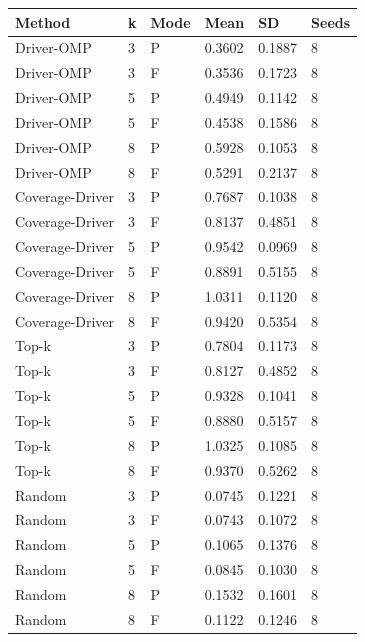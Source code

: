 \begin{tabular}{llllll}
\toprule
Method & k & Mode & Mean & SD & Seeds \\
\midrule
Driver-OMP & 3 & P & 0.3602 & 0.1887 & 8 \\
Driver-OMP & 3 & F & 0.3536 & 0.1723 & 8 \\
Driver-OMP & 5 & P & 0.4949 & 0.1142 & 8 \\
Driver-OMP & 5 & F & 0.4538 & 0.1586 & 8 \\
Driver-OMP & 8 & P & 0.5928 & 0.1053 & 8 \\
Driver-OMP & 8 & F & 0.5291 & 0.2137 & 8 \\
Coverage-Driver & 3 & P & 0.7687 & 0.1038 & 8 \\
Coverage-Driver & 3 & F & 0.8137 & 0.4851 & 8 \\
Coverage-Driver & 5 & P & 0.9542 & 0.0969 & 8 \\
Coverage-Driver & 5 & F & 0.8891 & 0.5155 & 8 \\
Coverage-Driver & 8 & P & 1.0311 & 0.1120 & 8 \\
Coverage-Driver & 8 & F & 0.9420 & 0.5354 & 8 \\
Top-k & 3 & P & 0.7804 & 0.1173 & 8 \\
Top-k & 3 & F & 0.8127 & 0.4852 & 8 \\
Top-k & 5 & P & 0.9328 & 0.1041 & 8 \\
Top-k & 5 & F & 0.8880 & 0.5157 & 8 \\
Top-k & 8 & P & 1.0325 & 0.1085 & 8 \\
Top-k & 8 & F & 0.9370 & 0.5262 & 8 \\
Random & 3 & P & 0.0745 & 0.1221 & 8 \\
Random & 3 & F & 0.0743 & 0.1072 & 8 \\
Random & 5 & P & 0.1065 & 0.1376 & 8 \\
Random & 5 & F & 0.0845 & 0.1030 & 8 \\
Random & 8 & P & 0.1532 & 0.1601 & 8 \\
Random & 8 & F & 0.1122 & 0.1246 & 8 \\
\bottomrule
\end{tabular}
